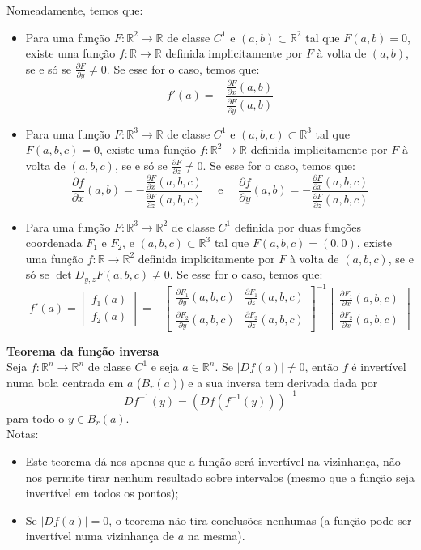 \documentclass{article}
\newcommand{\R}{\mathbb{R}}
\begin{document}
Nomeadamente, temos que:
\begin{itemize}
    \item Para uma função $F:\R^2 \to \R$ de classe $C^1$ e $(a,b) \subset \R^2$ tal que $F(a,b)=0$, existe uma função $f: \R \to \R$ definida implicitamente por $F$ à volta de $(a,b)$, se e só se $\frac{\partial F}{\partial y} \neq 0$. Se esse for o caso, temos que:
$$
f'(a) = -\frac{\frac{\partial F}{\partial x}(a,b)}{\frac{\partial F}{\partial y}(a,b)}
$$
    \item Para uma função $F:\R^3 \to \R$ de classe $C^1$ e $(a,b,c) \subset \R^3$ tal que $F(a,b,c)=0$, existe uma função $f: \R^2 \to \R$ definida implicitamente por $F$ à volta de $(a,b,c)$, se e só se $\frac{\partial F}{\partial z} \neq 0$. Se esse for o caso, temos que:
$$
\frac{\partial f}{\partial x}(a,b) = -\frac{\frac{\partial F}{\partial x}(a,b,c)}{\frac{\partial F}{\partial z}(a,b,c)} \quad \text{ e } 
\quad \frac{\partial f}{\partial y}(a,b) = -\frac{\frac{\partial F}{\partial x}(a,b,c)}{\frac{\partial F}{\partial z}(a,b,c)}
$$
    \item Para uma função $F:\R^3 \to \R^2$ de classe $C^1$ definida por duas funções coordenada $F_1$ e $F_2$, e $(a,b,c) \subset \R^3$ tal que $F(a,b,c)=(0,0)$, existe uma função $f: \R \to \R^2$ definida implicitamente por $F$ à volta de $(a,b,c)$, se e só se $\det D_{y,z}F(a,b,c) \neq 0$. Se esse for o caso, temos que:
$$
f'(a) = \begin{bmatrix} f_1(a) \\ f_2(a) \end{bmatrix} 
= - \begin{bmatrix} 
\frac{\partial F_1}{\partial y}(a,b,c) & \frac{\partial F_1}{\partial z}(a,b,c) \\
\frac{\partial F_2}{\partial y}(a,b,c) & \frac{\partial F_2}{\partial z}(a,b,c) 
\end{bmatrix}^{-1} \begin{bmatrix} \frac{\partial F_1}{\partial x}(a,b,c) \\
\frac{\partial F_2}{\partial x}(a,b,c) \end{bmatrix}
$$
\end{itemize}

\textbf{Teorema da função inversa}\\
Seja $f:\R^n \to \R^n$ de classe $C^1$ e seja $a \in \R^n$. Se $|Df(a)| \neq 0$, então $f$ é invertível numa bola centrada em $a$ ($B_r(a)$) e a sua inversa tem derivada dada por
$$
Df^{-1}(y) = \left( Df(f^{-1}(y)) \right)^{-1}
$$
para todo o $y \in B_r(a)$.\\
Notas:
\begin{itemize}
    \item Este teorema dá-nos apenas que a função será invertível na vizinhança, não nos permite tirar nenhum resultado sobre intervalos (mesmo que a função seja invertível em todos os pontos);
    \item Se $|Df(a)|=0$, o teorema não tira conclusões nenhumas (a função pode ser invertível numa vizinhança de $a$ na mesma).
\end{itemize}
\end{document}
